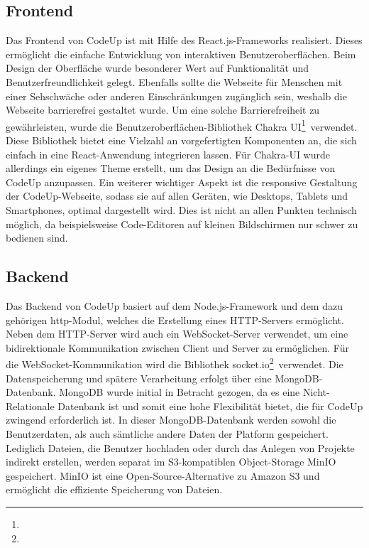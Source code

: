 \documentclass[main.tex]{subfiles}
\begin{document}
    \subsection{Frontend}
    Das Frontend von CodeUp ist mit Hilfe des React.js-Frameworks realisiert.
    Dieses ermöglicht die einfache Entwicklung von interaktiven Benutzeroberflächen.
    Beim Design der Oberfläche wurde besonderer Wert auf Funktionalität und Benutzerfreundlichkeit gelegt.
    Ebenfalls sollte die Webseite für Menschen mit einer Sehschwäche oder anderen Einschränkungen zugänglich sein, weshalb die Webseite barrierefrei gestaltet wurde.
    Um eine solche Barrierefreiheit zu gewährleisten, wurde die Benutzeroberflächen-Bibliothek \dq Chakra UI\dq \footnote{}\ verwendet.
    Diese Bibliothek bietet eine Vielzahl an vorgefertigten Komponenten an, die sich einfach in eine React-Anwendung integrieren lassen.
    Für Chakra-UI wurde allerdings ein eigenes Theme erstellt, um das Design an die Bedürfnisse von CodeUp anzupassen.
    Ein weiterer wichtiger Aspekt ist die responsive Gestaltung der CodeUp-Webseite, sodass sie auf allen Geräten, wie Desktops, Tablets und Smartphones, optimal dargestellt wird.
    Dies ist nicht an allen Punkten technisch möglich, da beispielsweise Code-Editoren auf kleinen Bildschirmen nur schwer zu bedienen sind.

    \subsection{Backend}
    Das Backend von CodeUp basiert auf dem Node.js-Framework und dem dazu gehörigen \dq http\dq-Modul, welches die Erstellung eines HTTP-Servers ermöglicht.
    Neben dem HTTP-Server wird auch ein WebSocket-Server verwendet, um eine bidirektionale Kommunikation zwischen Client und Server zu ermöglichen.
    Für die WebSocket-Kommunikation wird die Bibliothek \dq socket.io\dq \footnote{}\ verwendet.
    Die Datenspeicherung und spätere Verarbeitung erfolgt über eine MongoDB-Datenbank.
    MongoDB wurde initial in Betracht gezogen, da es eine Nicht-Relationale Datenbank ist und somit eine hohe Flexibilität bietet, die für CodeUp zwingend erforderlich ist.
    In dieser MongoDB-Datenbank werden sowohl die Benutzerdaten, als auch sämtliche andere Daten der Platform gespeichert.
    Lediglich Dateien, die Benutzer hochladen oder durch das Anlegen von Projekte indirekt erstellen, werden separat im S3-kompatiblen Object-Storage MinIO gespeichert.
    MinIO ist eine Open-Source-Alternative zu Amazon S3 und ermöglicht die effiziente Speicherung von Dateien.
\end{document}
